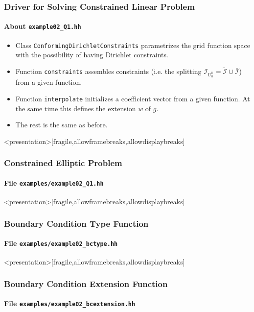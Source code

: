 \begin{frame}
\frametitle{Driver for Solving Constrained Linear Problem}
\framesubtitle{About \lstinline{example02_Q1.hh}}
\begin{itemize}
\item Class \lstinline{ConformingDirichletConstraints} parametrizes the grid function space
with the possibility of having Dirichlet constraints.
\item Function \lstinline{constraints} assembles constraints (i.e. the splitting 
$\mathcal{I}_{U_h^k} = \tilde{\mathcal{I}} \cup \bar{\mathcal{I}}$) from a given function.
\item Function \lstinline{interpolate} initializes a coefficient vector from a given function.
At the same time this defines the extension $w$ of $g$.
\item The rest is the same as before.
\end{itemize}
\end{frame}

\begin{frame}<presentation>[fragile,allowframebreaks,allowdisplaybreaks]
\frametitle<presentation>{Constrained Elliptic Problem}
\framesubtitle<presentation>{File \texttt{examples/example02\_Q1.hh}}

\end{frame}

\begin{frame}<presentation>[fragile,allowframebreaks,allowdisplaybreaks]
\frametitle<presentation>{Boundary Condition Type Function}
\framesubtitle<presentation>{File \texttt{examples/example02\_bctype.hh}}

\end{frame}

\begin{frame}<presentation>[fragile,allowframebreaks,allowdisplaybreaks]
\frametitle<presentation>{Boundary Condition Extension Function}
\framesubtitle<presentation>{File \texttt{examples/example02\_bcextension.hh}}

\end{frame}

